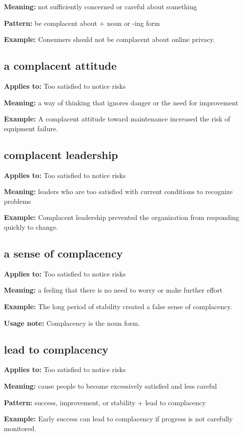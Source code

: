 \documentclass[11pt]{article}
\begin{document}
\textbf{Meaning:} not sufficiently concerned or careful about something

\textbf{Pattern:} be complacent about + noun or -ing form

\textbf{Example:} Consumers should not be complacent about online privacy.

\subsection{a complacent attitude}
\textbf{Applies to:} Too satisfied to notice risks

\textbf{Meaning:} a way of thinking that ignores danger or the need for improvement

\textbf{Example:} A complacent attitude toward maintenance increased the risk of equipment failure.

\subsection{complacent leadership}
\textbf{Applies to:} Too satisfied to notice risks

\textbf{Meaning:} leaders who are too satisfied with current conditions to recognize problems

\textbf{Example:} Complacent leadership prevented the organization from responding quickly to change.

\subsection{a sense of complacency}
\textbf{Applies to:} Too satisfied to notice risks

\textbf{Meaning:} a feeling that there is no need to worry or make further effort

\textbf{Example:} The long period of stability created a false sense of complacency.

\textbf{Usage note:} Complacency is the noun form.

\subsection{lead to complacency}
\textbf{Applies to:} Too satisfied to notice risks

\textbf{Meaning:} cause people to become excessively satisfied and less careful

\textbf{Pattern:} success, improvement, or stability + lead to complacency

\textbf{Example:} Early success can lead to complacency if progress is not carefully monitored.
\end{document}
